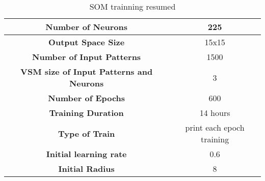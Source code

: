 \begin{table}[H]
  \caption{SOM trainning resumed}
  \label{tab:mac_test}
  \begin{center}
    \begin{tabular}{|c|c|}
      \hline
      \textbf{Number of Neurons} & 225 \\
      \hline
      \textbf{Output Space Size} & 15x15 \\
      \hline
      \textbf{Number of Input Patterns} & 1500 \\
      \hline
      \textbf{VSM size of Input Patterns and Neurons} & 3 \\
      \hline
      \textbf{Number of Epochs} & 600 \\
      \hline
      \textbf{Training Duration} & 14 hours \\
      \hline
      \textbf{Type of Train} & print each epoch training\\
      \hline
      \textbf{Initial learning rate} & 0.6\\
      \hline
      \textbf{Initial Radius} & 8\\
      \hline
    \end{tabular}
  \end{center}
\end{table}
